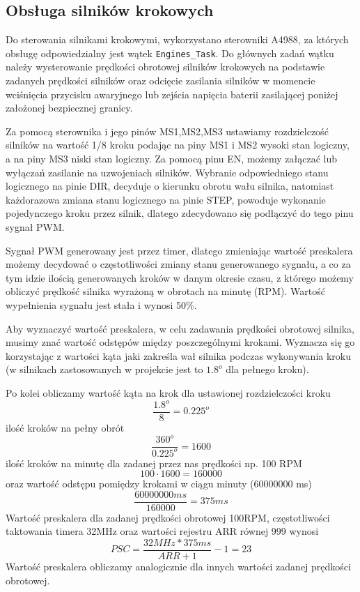 \newpage
\subsection{Obsługa silników krokowych}

Do sterowania silnikami krokowymi, wykorzystano sterowniki A4988, za których obsługę odpowiedzialny jest wątek \texttt{Engines\_Task}. Do głównych zadań wątku należy wysterowanie prędkości obrotowej silników krokowych na podstawie zadanych prędkości silników oraz odcięcie zasilania silników w momencie wciśnięcia przycisku awaryjnego lub zejścia napięcia baterii zasilającej poniżej założonej bezpiecznej granicy.

Za pomocą sterownika i jego pinów MS1,MS2,MS3 ustawiamy rozdzielczość silników na wartość 1/8 kroku podając na piny MS1 i MS2 wysoki stan logiczny, a na piny MS3 niski stan logiczny. Za pomocą pinu EN, możemy załączać lub wyłączań zasilanie na uzwojeniach silników. Wybranie odpowiedniego stanu logicznego na pinie DIR, decyduje o kierunku obrotu wału silnika, natomiast każdorazowa zmiana stanu logicznego na pinie STEP, powoduje wykonanie pojedynczego kroku przez silnik, dlatego zdecydowano się podłączyć do tego pinu sygnał PWM.

Sygnał PWM generowany jest przez timer, dlatego zmieniając wartość preskalera możemy decydować o częstotliwości zmiany stanu generowanego sygnału, a co za tym idzie ilością generowanych kroków w danym okresie czasu, z którego możemy obliczyć prędkość silnika wyrażoną w obrotach na minutę (RPM). Wartość wypełnienia sygnału jest stała i wynosi 50\%. 

Aby wyznaczyć wartość preskalera, w celu zadawania prędkości obrotowej silnika, musimy znać wartość odstępów między poszczególnymi krokami. Wyznacza się go korzystając z wartości kąta jaki zakreśla wał silnika podczas wykonywania kroku (w silnikach zastosowanych w projekcie jest to $1.8^o$ dla pełnego kroku).

Po kolei obliczamy wartość kąta na krok dla ustawionej rozdzielczości kroku
$$
    \frac{1.8^o}{8} = 0.225^o
$$
ilość kroków na pełny obrót
$$
    \frac{360^o}{0.225^o} = 1600
$$
ilość kroków na minutę dla zadanej przez nas prędkości np. 100 RPM
$$
    100 \cdot 1600 = 160000
$$
oraz wartość odstępu pomiędzy krokami w ciągu minuty (60000000 ms)
$$
    \frac{60000000ms}{160000} = 375 ms
$$
Wartość preskalera dla zadanej prędkości obrotowej 100RPM, częstotliwości taktowania timera 32MHz oraz wartości rejestru ARR równej 999 wynosi
$$
    PSC = \frac{32MHz * 375ms}{ARR + 1} - 1 = 23
$$
Wartość preskalera obliczamy analogicznie dla innych wartości zadanej prędkości obrotowej.

